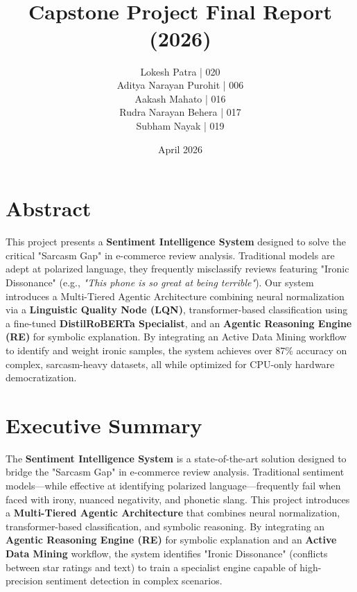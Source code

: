\documentclass[11pt,oneside]{scrbook}
\title{
    \vspace{0.3cm}
    \Huge \textbf{\projecttitle}\\
    \Large \textit{\mysubtitle}\\
    \vspace{0.3cm}
    \Large Capstone Project Final Report (2026)
}
\author{
    Lokesh Patra | 020 \\
    Aditya Narayan Purohit | 006 \\
    Aakash Mahato | 016 \\
    Rudra Narayan Behera | 017 \\
    Subham Nayak | 019
}
\date{April 2026}
\begin{document}
\frontmatter
\pagestyle{plain}   %
\maketitle

\chapter*{Abstract}
This project presents a \textbf{Sentiment Intelligence System} designed to solve the critical "Sarcasm Gap" in e-commerce review analysis. Traditional models are adept at polarized language, they frequently misclassify reviews featuring "Ironic Dissonance" (e.g., \textit{"This phone is so great at being terrible"}). Our system introduces a Multi-Tiered Agentic Architecture combining neural normalization via a \textbf{Linguistic Quality Node (LQN)}, transformer-based classification using a fine-tuned \textbf{DistilRoBERTa Specialist}, and an \textbf{Agentic Reasoning Engine (RE)} for symbolic explanation. By integrating an Active Data Mining workflow to identify and weight ironic samples, the system achieves over 87\% accuracy on complex, sarcasm-heavy datasets, all while optimized for CPU-only hardware democratization.

\chapter*{Executive Summary}
The \textbf{Sentiment Intelligence System} is a state-of-the-art solution designed to bridge the "Sarcasm Gap" in e-commerce review analysis. Traditional sentiment models---while effective at identifying polarized language---frequently fail when faced with irony, nuanced negativity, and phonetic slang. This project introduces a \textbf{Multi-Tiered Agentic Architecture} that combines neural normalization, transformer-based classification, and symbolic reasoning. By integrating an \textbf{Agentic Reasoning Engine (RE)} for symbolic explanation and an \textbf{Active Data Mining} workflow, the system identifies "Ironic Dissonance" (conflicts between star ratings and text) to train a specialist engine capable of high-precision sentiment detection in complex scenarios.

\tableofcontents
\listoftables
\listoffigures

\mainmatter
\pagestyle{scrheadings}
\renewcommand{\chapterpagestyle}{scrheadings}
\end{document}

